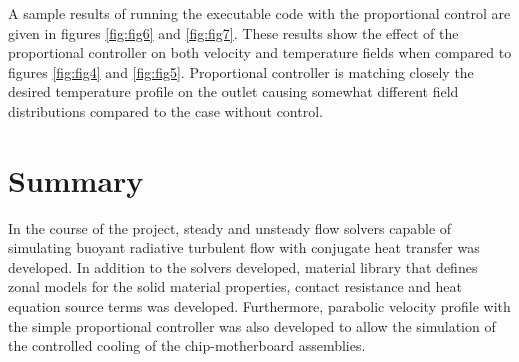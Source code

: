 A sample results of running the executable code with the proportional
control are given in figures \ref{fig:fig6} and \ref{fig:fig7}. These
results show the effect of the proportional controller on both velocity
and temperature fields when compared to figures \ref{fig:fig4}
and \ref{fig:fig5}. Proportional controller is matching closely the
desired temperature profile on the outlet causing somewhat different
field distributions compared to the case without control.

\begin{figure*}[htbp]
\begin{center}
\caption{Temperature distribution}
\label{fig:fig6}
\end{center}
\end{figure*}

\begin{figure*}[htbp]
\begin{center}
\caption{Velocity magnitude distribution}
\label{fig:fig7}
\end{center}
\end{figure*}



\section*{Summary}

In the course of the project, steady and unsteady flow solvers capable
of simulating buoyant radiative turbulent flow with conjugate heat
transfer was developed. In addition to the solvers developed, material
library that defines zonal models for the solid material properties,
contact resistance and heat equation source terms was
developed. Furthermore, parabolic velocity profile with the simple
proportional controller was also developed to allow the simulation of
the controlled cooling of the chip-motherboard assemblies.




